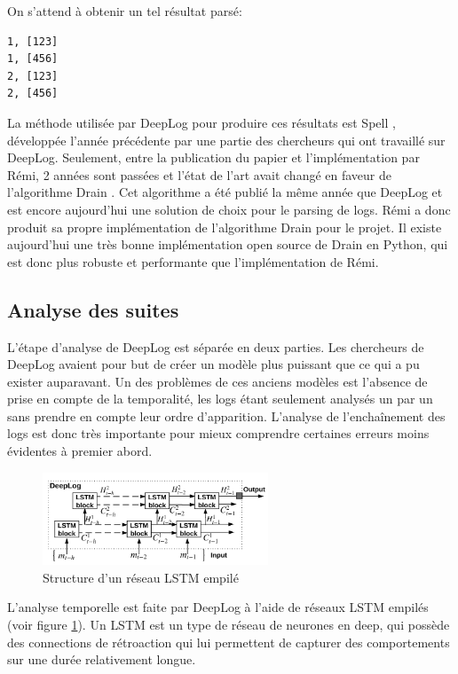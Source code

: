 \documentclass[openany, 11pt]{memoir}
\begin{document}
On s'attend à obtenir un tel résultat parsé:

\begin{lstlisting}
1, [123]
1, [456]
2, [123]
2, [456]
\end{lstlisting}

La méthode utilisée par DeepLog pour produire ces résultats est Spell \cite{spell}, développée l'année précédente par une partie des chercheurs qui ont travaillé sur DeepLog. Seulement, entre la publication du papier et l'implémentation par Rémi, 2 années sont passées et l'état de l'art avait changé en faveur de l'algorithme Drain \cite{drain}. Cet algorithme a été publié la même année que DeepLog et est encore aujourd'hui une solution de choix pour le parsing de \glspl{log}. Rémi a donc produit sa propre implémentation de l'algorithme Drain pour le projet. Il existe aujourd'hui une très bonne implémentation open source de Drain en Python, qui est donc plus robuste et performante que l'implémentation de Rémi.

\subsection{Analyse des suites}

L'étape d'analyse de DeepLog est séparée en deux parties. Les chercheurs de DeepLog avaient pour but de créer un modèle plus puissant que ce qui a pu exister auparavant. Un des problèmes de ces anciens modèles est l'absence de prise en compte de la temporalité, les \glspl{log} étant seulement analysés un par un sans prendre en compte leur ordre d'apparition. L'analyse de l'enchaînement des logs est donc très importante pour mieux comprendre certaines erreurs moins évidentes à premier abord.

\begin{figure}[ht]
	\centering
	\includegraphics[width=0.6\textwidth]{images/stacked_lstm.png}
	\caption{Structure d'un réseau LSTM empilé}
	\label{lstm}
\end{figure}

L'analyse temporelle est faite par DeepLog à l'aide de réseaux \gls{LSTM} empilés (voir figure \ref{lstm}). Un \gls{LSTM} est un type de réseau de neurones en \gls{deep}, qui possède des connections de rétroaction qui lui permettent de capturer des comportements sur une durée relativement longue.
\end{document}
